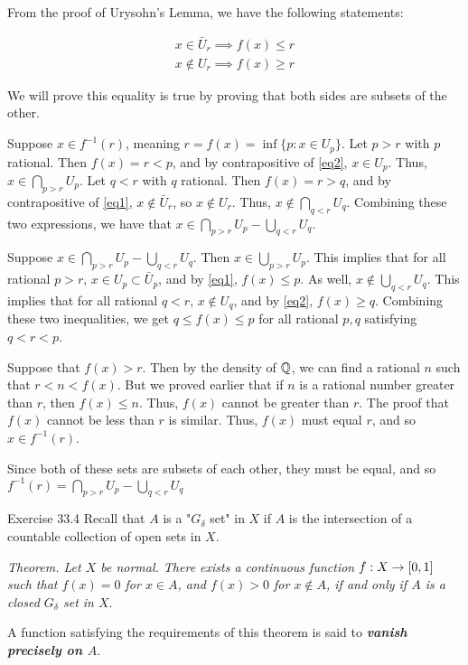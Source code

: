\documentclass{hmwk}
\begin{document}
\begin{solution}


\pre From the proof of Urysohn's Lemma, we have the following statements:

\begin{align}
    \label{eq1}
    x \in \bar{U}_r \implies f(x) \leq r \\
    \label{eq2}
    x \notin U_r \implies f(x) \geq r
\end{align}

\pre We will prove this equality is true by proving that both sides are subsets of the other. 

\pre Suppose $x \in f^{-1}(r)$, meaning $r = f(x) = \inf\{p : x \in U_p\}$. Let $p > r$ with $p$ rational. Then $f(x) = r < p$, and by contrapositive of \eqref{eq2}, $x \in U_p$. Thus, $x \in \bigcap_{p > r}U_p$. Let $q < r$ with $q$ rational. Then $f(x) = r > q$, and by contrapositive of \eqref{eq1}, $x \notin \bar{U}_r$, so $x \notin U_r$. Thus, $x \notin \bigcap_{q < r}U_q$. Combining these two expressions, we have that $x \in \bigcap_{p > r}U_p - \bigcup_{q < r}U_q$. 

\pre Suppose $x \in \bigcap_{p > r}U_p - \bigcup_{q < r}U_q$. Then $x \in \bigcup_{p > r}U_p$. This implies that for all rational $p > r$, $x \in U_p \subset \bar{U}_p$, and by \eqref{eq1}, $f(x) \leq p$. As well, $x \notin \bigcup_{q < r}U_q$. This implies that for all rational $q < r$, $x \notin U_q$, and by \eqref{eq2}, $f(x) \geq q$. Combining these two inequalities, we get $q \leq f(x) \leq p$ for all rational $p, q$ satisfying $q < r < p$. 

\pre Suppose that $f(x) > r$. Then by the density of $\mathbb{Q}$, we can find a rational $n$ such that $r < n < f(x)$. But we proved earlier that if $n$ is a rational number greater than $r$, then $f(x) \leq n$. Thus, $f(x)$ cannot be greater than $r$. The proof that $f(x)$ cannot be less than $r$ is similar. Thus, $f(x)$ must equal $r$, and so $x \in f^{-1}(r)$.

\pre Since both of these sets are subsets of each other, they must be equal, and so $f^{-1}(r) = \bigcap_{p > r}U_p - \bigcup_{q < r}U_q$
\end{solution}

\begin{problem}{Exercise 33.4}
    Recall that $A$ is a "$G_\delta$ set" in $X$ if $A$ is the intersection of a countable collection of open sets in $X$. 

    \pre \textit{Theorem. Let $X$ be normal. There exists a continuous function $f: X \rightarrow [0, 1]$ such that $f(x) = 0$ for $x \in A$, and $f(x) > 0$ for $x \notin A$, if and only if $A$ is a closed $G_\delta$ set in $X$}.

    \pre A function satisfying the requirements of this theorem is said to \textbf{\textit{vanish precisely on $A$}}.
\end{problem}
\end{document}
